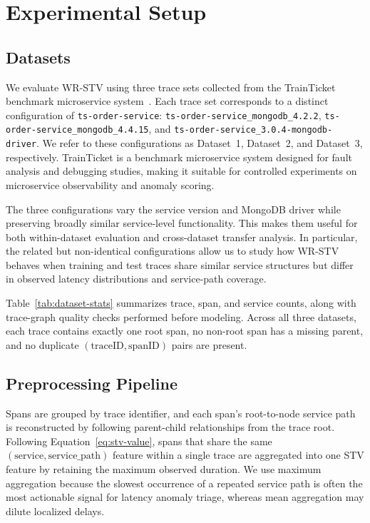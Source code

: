 \section{Experimental Setup}
\label{sec:experimental-setup}

\subsection{Datasets}

We evaluate WR-STV using three trace sets collected from the
TrainTicket benchmark microservice system~\cite{zhou2021trainticket}.
Each trace set corresponds to a distinct configuration of
\texttt{ts-order-service}:
\texttt{ts-order-service\_mongodb\_4.2.2},
\texttt{ts-order-service\_mongodb\_4.4.15}, and
\texttt{ts-order-service\_3.0.4-mongodb-driver}. We refer to these
configurations as Dataset~1, Dataset~2, and Dataset~3, respectively.
TrainTicket is a benchmark microservice system designed for fault
analysis and debugging studies, making it suitable for controlled
experiments on microservice observability and anomaly scoring.

The three configurations vary the service version and MongoDB driver
while preserving broadly similar service-level functionality. This makes
them useful for both within-dataset evaluation and cross-dataset transfer
analysis. In particular, the related but non-identical configurations
allow us to study how WR-STV behaves when training and test traces share
similar service structures but differ in observed latency distributions
and service-path coverage.

Table~\ref{tab:dataset-stats} summarizes trace, span, and service
counts, along with trace-graph quality checks performed before modeling.
Across all three datasets, each trace contains exactly one root span, no
non-root span has a missing parent, and no duplicate
\((\text{traceID}, \text{spanID})\) pairs are present.



\subsection{Preprocessing Pipeline}

Spans are grouped by trace identifier, and each span's root-to-node
service path is reconstructed by following parent-child relationships
from the trace root. Following Equation~\ref{eq:stv-value}, spans that
share the same \((\text{service}, \text{service\_path})\) feature within
a single trace are aggregated into one STV feature by retaining the
maximum observed duration. We use maximum aggregation because the slowest
occurrence of a repeated service path is often the most actionable signal
for latency anomaly triage, whereas mean aggregation may dilute localized
delays.

